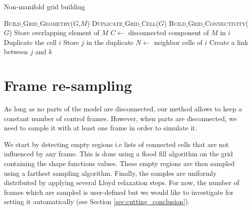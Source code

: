 \begin{algorithm}[!h]
\caption[Frame-based cutting: Non-manifold grid building]{\label{alg:nonmanifoldbuilding}Non-manifold grid building}
\begin{algorithmic}[1]
\State \textsc{Build$\_$Grid$\_$Geometry}($G$,$M$)
\State \textsc{Duplicate$\_$Grid$\_$Cell}($G$)
\State \textsc{Build$\_$Grid$\_$Connectivity}($G$)
\EndProcedure
\State
{}
\State Store overlapping element of $M$
\EndFor
\EndProcedure
\State
{}
\State $C \gets $ disconnected component of $M$ in $i$
	\State Duplicate the cell $i$
	\State Store $j$ in the duplicate
\EndFor
\EndFor
\EndProcedure
\State
{}
\State $N \gets $ neighbor cells of $i$
\State Create a link between $j$ and $k$ 
\EndIf
\EndFor
\EndFor
\EndFor
\EndProcedure
\end{algorithmic}
\end{algorithm}

\newpage 


\section{Frame re-sampling} \label{sec:resampling}
As long as no parts of the model are disconnected, our method allows to keep a constant number of control frames. However, when parts are disconnected, we need to sample it with at least one frame in order to simulate it. 

We start by detecting empty regions i.e lists of connected cells that are not influenced by any frame. This is done using a flood fill algorithm on the grid containing the shape functions values. These empty regions are then sampled using a farthest sampling algorithm. Finally, the samples are uniformly distributed by applying several Lloyd relaxation steps. For now, the number of frames which are sampled is user-defined but we would like to investigate for setting it automatically (see Section \ref{sec:cutting_conclusion}). 

